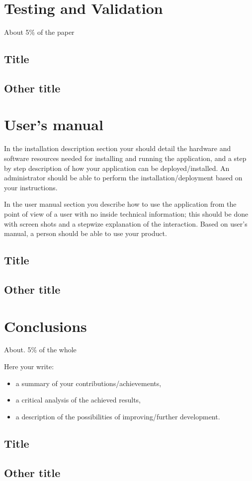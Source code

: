 \documentclass[12pt,a4paper,twoside]{report}
\begin{document}
\chapter{Testing and Validation}

About 5\% of the paper
\section{Title}
\section{Other title}

\chapter{User's manual}

In the installation description section your should detail the hardware and software resources needed for installing and running the application, and a step by step description of how your application can be deployed/installed. An administrator should be able to perform the installation/deployment based on your instructions.

In the user manual section you describe how to use the application from the point of view of a user with no inside technical information; this should be done with screen shots and a stepwize explanation of the interaction. Based on user's manual, a person should be able to use your product.

\section{Title}
\section{Other title}

\chapter{Conclusions}

About. 5\% of the whole

Here your write:
\begin{itemize}
\item a summary of your contributions/achievements,
\item a critical analysis of the achieved results,
\item a description of the possibilities of improving/further development.
\end{itemize}
\section{Title}
\section{Other title}


 


\end{document}
